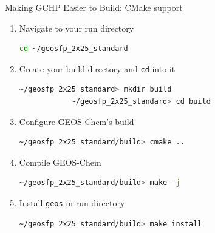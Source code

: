 \documentclass[10pt]{beamer}
\begin{document}
\begin{frame}[fragile]{Making GCHP Easier to Build: CMake support}
    \begin{minipage}[c]{0.6\textwidth}
        \footnotesize
        \begin{enumerate}
            \item Navigate to your run directory
            \begin{lstlisting}[language=bash,morekeywords={mkdir,cmake,make},]
            cd ~/geosfp_2x25_standard
            \end{lstlisting}
            \item Create your build directory and \texttt{cd} into it
            \begin{lstlisting}[language=bash,morekeywords={mkdir,cmake,make},]
            ~/geosfp_2x25_standard> mkdir build
            ~/geosfp_2x25_standard> cd build
            \end{lstlisting}
            \item Configure GEOS-Chem's build
            \begin{lstlisting}[language=bash,morekeywords={mkdir,cmake,make},]
            ~/geosfp_2x25_standard/build> cmake ..
            \end{lstlisting}
            \item Compile GEOS-Chem
            \begin{lstlisting}[language=bash,morekeywords={mkdir,cmake,make},]
            ~/geosfp_2x25_standard/build> make -j
            \end{lstlisting}
            \item Install \texttt{geos} in run directory
            \begin{lstlisting}[language=bash,morekeywords={mkdir,cmake,make},]
            ~/geosfp_2x25_standard/build> make install
            \end{lstlisting}
        \end{enumerate}


\end{minipage}
\end{frame}
\end{document}
